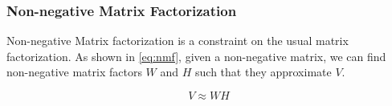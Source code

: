 
\subsubsection{Non-negative Matrix Factorization}

Non-negative Matrix factorization is a constraint on the usual matrix factorization. As shown in \ref{eq:nmf}, given a non-negative matrix, we can find non-negative matrix factors $W$ and $H$ such that they approximate $V$.

\begin{equation} \label{eq:nmf}
	V \approx W H
\end{equation}


